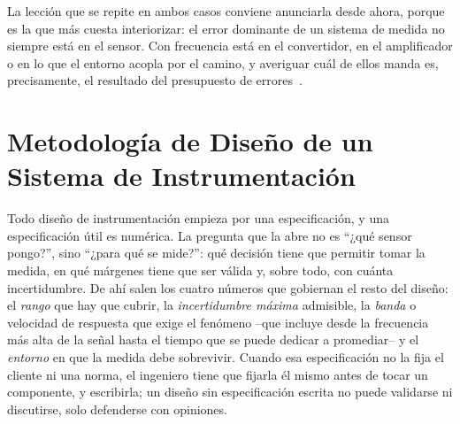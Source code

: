 La lección que se repite en ambos casos conviene anunciarla desde ahora, porque es la que más cuesta interiorizar: el error dominante de un sistema de medida no siempre está en el sensor. Con frecuencia está en el convertidor, en el amplificador o en lo que el entorno acopla por el camino, y averiguar cuál de ellos manda es, precisamente, el resultado del presupuesto de errores~\cite{jcgm100_2008_gum,taylor1997erroranalysis}.

\section{Metodología de Diseño de un Sistema de Instrumentación}\label{sec:metodologia_diseno}

Todo diseño de instrumentación empieza por una especificación, y una especificación útil es numérica. La pregunta que la abre no es ``¿qué sensor pongo?'', sino ``¿para qué se mide?'': qué decisión tiene que permitir tomar la medida, en qué márgenes tiene que ser válida y, sobre todo, con cuánta incertidumbre. De ahí salen los cuatro números que gobiernan el resto del diseño: el \emph{rango} que hay que cubrir, la \emph{incertidumbre máxima} admisible, la \emph{banda} o velocidad de respuesta que exige el fenómeno --que incluye desde la frecuencia más alta de la señal hasta el tiempo que se puede dedicar a promediar-- y el \emph{entorno} en que la medida debe sobrevivir. Cuando esa especificación no la fija el cliente ni una norma, el ingeniero tiene que fijarla él mismo antes de tocar un componente, y escribirla; un diseño sin especificación escrita no puede validarse ni discutirse, solo defenderse con opiniones.


